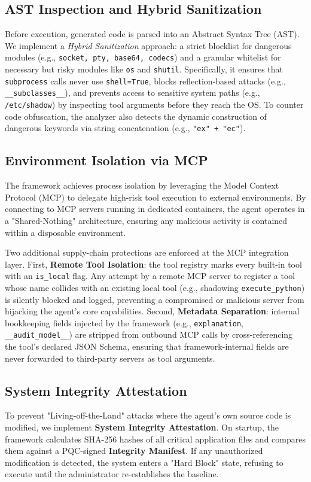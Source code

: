 \documentclass[conference]{IEEEtran}
\begin{document}
\subsection{AST Inspection and Hybrid Sanitization}
Before execution, generated code is parsed into an Abstract Syntax Tree (AST). We implement a \textit{Hybrid Sanitization} approach: a strict blocklist for dangerous modules (e.g., \texttt{socket, pty, base64, codecs}) and a granular whitelist for necessary but risky modules like \texttt{os} and \texttt{shutil}. Specifically, it ensures that \texttt{subprocess} calls never use \texttt{shell=True}, blocks reflection-based attacks (e.g., \texttt{\_\_subclasses\_\_}), and prevents access to sensitive system paths (e.g., \texttt{/etc/shadow}) by inspecting tool arguments before they reach the OS. To counter code obfuscation, the analyzer also detects the dynamic construction of dangerous keywords via string concatenation (e.g., \texttt{"ex" + "ec"}).

\subsection{Environment Isolation via MCP}
The framework achieves process isolation by leveraging the Model Context Protocol (MCP) to delegate high-risk tool execution to external environments. By connecting to MCP servers running in dedicated containers, the agent operates in a "Shared-Nothing" architecture, ensuring any malicious activity is contained within a disposable environment.

Two additional supply-chain protections are enforced at the MCP integration layer. First, \textbf{Remote Tool Isolation}: the tool registry marks every built-in tool with an \texttt{is\_local} flag. Any attempt by a remote MCP server to register a tool whose name collides with an existing local tool (e.g., shadowing \texttt{execute\_python}) is silently blocked and logged, preventing a compromised or malicious server from hijacking the agent's core capabilities. Second, \textbf{Metadata Separation}: internal bookkeeping fields injected by the framework (e.g., \texttt{explanation}, \texttt{\_\_audit\_model\_\_}) are stripped from outbound MCP calls by cross-referencing the tool's declared JSON Schema, ensuring that framework-internal fields are never forwarded to third-party servers as tool arguments.

\subsection{System Integrity Attestation}
To prevent "Living-off-the-Land" attacks where the agent's own source code is modified, we implement \textbf{System Integrity Attestation}. On startup, the framework calculates SHA-256 hashes of all critical application files and compares them against a PQC-signed \textbf{Integrity Manifest}. If any unauthorized modification is detected, the system enters a "Hard Block" state, refusing to execute until the administrator re-establishes the baseline.
\end{document}
